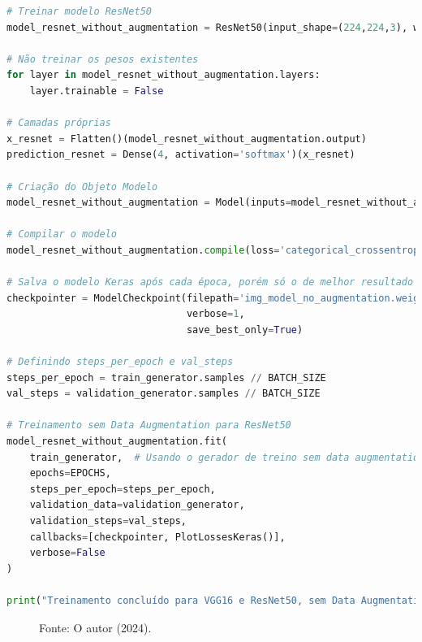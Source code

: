 \begin{lstlisting}[language=Python, style=input]
# Treinar modelo ResNet50
model_resnet_without_augmentation = ResNet50(input_shape=(224,224,3), weights='imagenet', include_top=False)

# Não treinar os pesos existentes
for layer in model_resnet_without_augmentation.layers:
    layer.trainable = False

# Camadas próprias
x_resnet = Flatten()(model_resnet_without_augmentation.output)
prediction_resnet = Dense(4, activation='softmax')(x_resnet)

# Criação do Objeto Modelo
model_resnet_without_augmentation = Model(inputs=model_resnet_without_augmentation.input, outputs=prediction_resnet)

# Compilar o modelo
model_resnet_without_augmentation.compile(loss='categorical_crossentropy', optimizer=RMSprop(learning_rate=0.0001), metrics=['accuracy'])

# Salva o modelo Keras após cada época, porém só o de melhor resultado
checkpointer = ModelCheckpoint(filepath='img_model_no_augmentation.weights.best.keras',
                               verbose=1,
                               save_best_only=True)

# Definindo steps_per_epoch e val_steps
steps_per_epoch = train_generator.samples // BATCH_SIZE
val_steps = validation_generator.samples // BATCH_SIZE

# Treinamento sem Data Augmentation para ResNet50
model_resnet_without_augmentation.fit(
    train_generator,  # Usando o gerador de treino sem data augmentation
    epochs=EPOCHS,
    steps_per_epoch=steps_per_epoch,
    validation_data=validation_generator,
    validation_steps=val_steps,
    callbacks=[checkpointer, PlotLossesKeras()],
    verbose=False
)

print("Treinamento concluído para VGG16 e ResNet50, sem Data Augmentation.")
\end{lstlisting}
\begin{figure}[h!]
\centering
\caption{Acurácia e perda ResNet50 sem data augmentation}
\hspace*{-2cm} %
\caption*{Fonte: O autor (2024).}
\end{figure}


